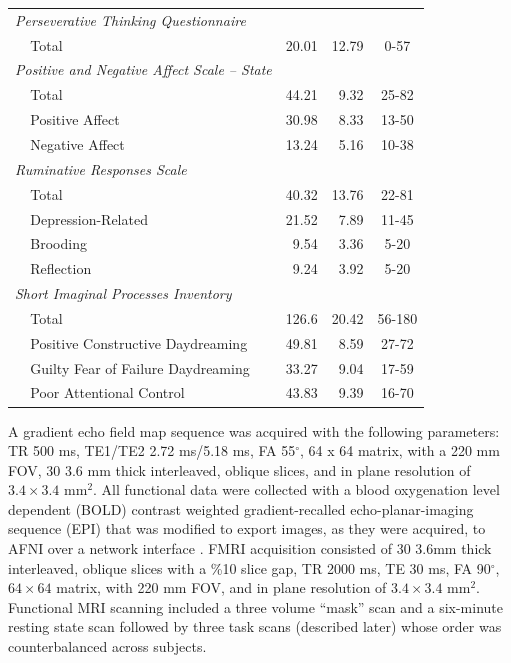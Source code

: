 \begin{table}[h!]
\begin{tabular}{ llrrc }
        \multicolumn{2}{l}{\emph{Perseverative Thinking Questionnaire}} &&& \\
        & Total & 20.01 & 12.79 & 0-57 \\
        \multicolumn{2}{l}{\emph{Positive and Negative Affect Scale – State}} & & & \\
        & Total & 44.21 & 9.32 & 25-82 \\
        & Positive Affect & 30.98 & 8.33 & 13-50 \\
        & Negative Affect & 13.24 & 5.16 & 10-38 \\
        \multicolumn{2}{l}{\emph{Ruminative Responses Scale}} & & & \\
        & Total & 40.32 & 13.76 & 22-81 \\
        & Depression-Related & 21.52 & 7.89 & 11-45 \\
        & Brooding & 9.54 & 3.36 & 5-20 \\
        & Reflection & 9.24 & 3.92 & 5-20 \\
        \multicolumn{2}{l}{\emph{Short Imaginal Processes Inventory}} &&& \\
        & Total & 126.6 & 20.42 & 56-180 \\
        & Positive Constructive Daydreaming & 49.81 & 8.59 & 27-72 \\
        & Guilty Fear of Failure Daydreaming & 33.27 & 9.04 & 17-59 \\
        & Poor Attentional Control & 43.83 & 9.39 & 16-70 \\
      \end{tabular}
\label{table:assessments}
\end{table}

A gradient echo field map sequence was acquired with the following parameters: TR 500 ms, TE1/TE2 2.72 ms/5.18 ms, FA 55$^\circ$, 64 x 64 matrix, with a 220 mm FOV, 30 3.6 mm thick interleaved, oblique slices, and in plane resolution of $3.4 \times 3.4$ mm$^2$. All functional data were collected with a blood oxygenation level dependent (BOLD) contrast weighted gradient-recalled echo-planar-imaging sequence (EPI) that was modified to export images, as they were acquired, to AFNI over a network interface \cite{Cox1995,LaConte2007}. FMRI acquisition consisted of 30 3.6mm thick interleaved, oblique slices with a \%10 slice gap, TR 2000 ms, TE 30 ms, FA 90$^\circ$, $64 \times 64$ matrix, with 220 mm FOV, and in plane resolution of $3.4 \times 3.4$ mm$^2$. Functional MRI scanning included a three volume “mask” scan and a six-minute resting state scan followed by three task scans (described later) whose order was counterbalanced across subjects.

